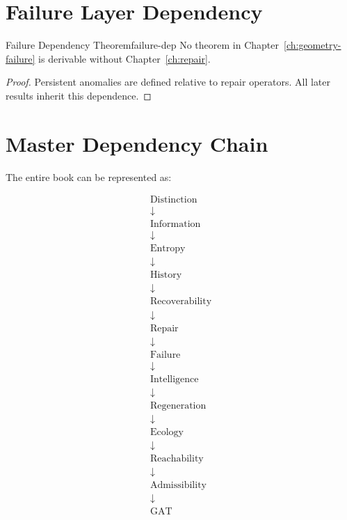\documentclass[12pt,twoside,openright]{book}
\begin{document}
\section{Failure Layer Dependency}

\begin{theorem}{Failure Dependency Theorem}{failure-dep}
  No theorem in Chapter~\ref{ch:geometry-failure} is
  derivable without Chapter~\ref{ch:repair}.
\end{theorem}

\begin{proof}
  Persistent anomalies are defined relative to repair
  operators. All later results inherit this dependence.
\end{proof}

\section{Master Dependency Chain}

The entire book can be represented as:

\[
\begin{array}{c}
\text{Distinction} \\
\downarrow \\
\text{Information} \\
\downarrow \\
\text{Entropy} \\
\downarrow \\
\text{History} \\
\downarrow \\
\text{Recoverability} \\
\downarrow \\
\text{Repair} \\
\downarrow \\
\text{Failure} \\
\downarrow \\
\text{Intelligence} \\
\downarrow \\
\text{Regeneration} \\
\downarrow \\
\text{Ecology} \\
\downarrow \\
\text{Reachability} \\
\downarrow \\
\text{Admissibility} \\
\downarrow \\
\text{GAT}
\end{array}
\]
\end{document}
